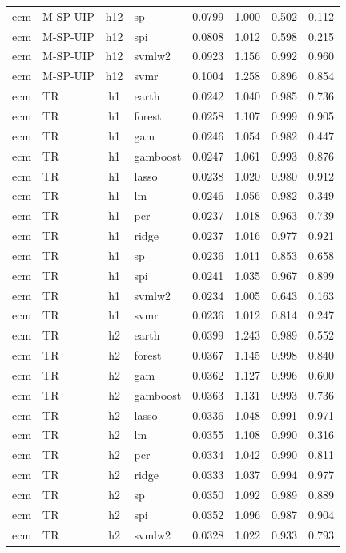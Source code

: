 \begin{ThreePartTable}
\begin{longtable}[t]{llclcccc}
ecm & M-SP-UIP & h12 & sp & 0.0799 & 1.000 & 0.502 & 0.112\\
ecm & M-SP-UIP & h12 & spi & 0.0808 & 1.012 & 0.598 & 0.215\\
ecm & M-SP-UIP & h12 & svmlw2 & 0.0923 & 1.156 & 0.992 & 0.960\\
ecm & M-SP-UIP & h12 & svmr & 0.1004 & 1.258 & 0.896 & 0.854\\
\addlinespace
ecm & TR & h1 & earth & 0.0242 & 1.040 & 0.985 & 0.736\\
ecm & TR & h1 & forest & 0.0258 & 1.107 & 0.999 & 0.905\\
ecm & TR & h1 & gam & 0.0246 & 1.054 & 0.982 & 0.447\\
ecm & TR & h1 & gamboost & 0.0247 & 1.061 & 0.993 & 0.876\\
ecm & TR & h1 & lasso & 0.0238 & 1.020 & 0.980 & 0.912\\
ecm & TR & h1 & lm & 0.0246 & 1.056 & 0.982 & 0.349\\
ecm & TR & h1 & pcr & 0.0237 & 1.018 & 0.963 & 0.739\\
ecm & TR & h1 & ridge & 0.0237 & 1.016 & 0.977 & 0.921\\
ecm & TR & h1 & sp & 0.0236 & 1.011 & 0.853 & 0.658\\
ecm & TR & h1 & spi & 0.0241 & 1.035 & 0.967 & 0.899\\
ecm & TR & h1 & svmlw2 & 0.0234 & 1.005 & 0.643 & 0.163\\
ecm & TR & h1 & svmr & 0.0236 & 1.012 & 0.814 & 0.247\\
\addlinespace
ecm & TR & h2 & earth & 0.0399 & 1.243 & 0.989 & 0.552\\
ecm & TR & h2 & forest & 0.0367 & 1.145 & 0.998 & 0.840\\
ecm & TR & h2 & gam & 0.0362 & 1.127 & 0.996 & 0.600\\
ecm & TR & h2 & gamboost & 0.0363 & 1.131 & 0.993 & 0.736\\
ecm & TR & h2 & lasso & 0.0336 & 1.048 & 0.991 & 0.971\\
ecm & TR & h2 & lm & 0.0355 & 1.108 & 0.990 & 0.316\\
ecm & TR & h2 & pcr & 0.0334 & 1.042 & 0.990 & 0.811\\
ecm & TR & h2 & ridge & 0.0333 & 1.037 & 0.994 & 0.977\\
ecm & TR & h2 & sp & 0.0350 & 1.092 & 0.989 & 0.889\\
ecm & TR & h2 & spi & 0.0352 & 1.096 & 0.987 & 0.904\\
ecm & TR & h2 & svmlw2 & 0.0328 & 1.022 & 0.933 & 0.793\\

\end{longtable}
\end{ThreePartTable}
